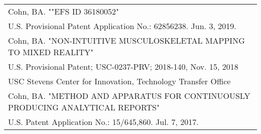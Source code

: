 \documentclass[10pt,a4paper]{article}
\begin{document}
  \vspace*{1mm}
  \begin{tabularx}{17cm}{X}


Cohn, BA. ""EFS ID 36180052"\\
 U.S. Provisional Patent Application No.: 62856238. Jun. 3, 2019.\\[2mm]

Cohn, BA. "NON-INTUITIVE MUSCULOSKELETAL MAPPING TO MIXED REALITY"\\
 U.S. Provisional Patent; USC-0237-PRV; 2018-140, Nov. 15, 2018\\
 USC Stevens Center for Innovation, Technology Transfer Office\\[2mm]

 Cohn, BA. "METHOD AND APPARATUS FOR CONTINUOUSLY PRODUCING ANALYTICAL REPORTS"\\
 U.S. Patent Application No.: 15/645,860. Jul. 7, 2017.\\[2mm]


  \end{tabularx}
\end{document}

